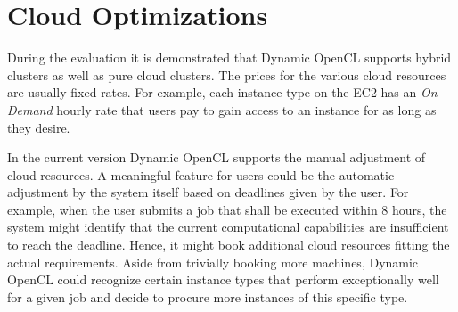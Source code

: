 \section*{Cloud Optimizations}

During the evaluation it is demonstrated that Dynamic OpenCL supports hybrid clusters as well as pure cloud clusters. The prices for the various cloud resources are usually fixed rates. For example, each instance type on the EC2 has an \textit{On-Demand} hourly rate that users pay to gain access to an instance for as long as they desire.

In the current version Dynamic OpenCL supports the manual adjustment of cloud resources. A meaningful feature for users could be the automatic adjustment by the system itself based on deadlines given by the user. For example, when the user submits a job that shall be executed within 8 hours, the system might identify that the current computational capabilities are insufficient to reach the deadline. Hence, it might book additional cloud resources fitting the actual requirements. Aside from trivially booking more machines, Dynamic OpenCL could recognize certain instance types that perform exceptionally well for a given job and decide to procure more instances of this specific type.

